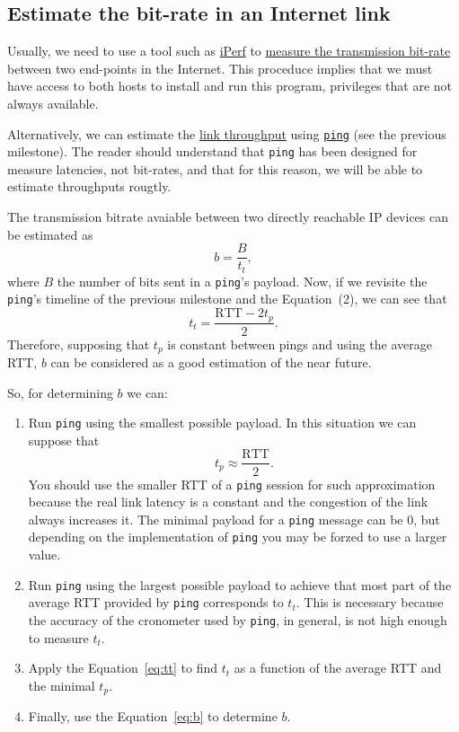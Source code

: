 \subsection{Estimate the bit-rate in an Internet link}

Usually, we need to use a tool such as \href{https://iperf.fr/}{iPerf}
to
\href{https://en.wikipedia.org/wiki/Measuring_network_throughput}{measure
  the transmission bit-rate} between two end-points in the
Internet. This proceduce implies that we must have access to both
hosts to install and run this program, privileges that are not always
available.

Alternatively, we can estimate the
\href{https://en.wikipedia.org/wiki/Throughput}{link throughput} using
\href{https://github.com/torvalds/linux/blob/master/net/ipv4/ping.c}{\texttt{ping}}
(see the previous milestone). The reader should understand that
\texttt{ping} has been designed for measure latencies, not bit-rates,
and that for this reason, we will be able to estimate throughputs
rougtly.

The transmission bitrate avaiable between two directly reachable IP
devices can be estimated as
\begin{equation}
  b=\frac{B}{t_t},
  \label{eq:b}
\end{equation}
where $B$ the number of bits sent in a \texttt{ping}'s payload. Now,
if we revisite the \texttt{ping}'s timeline of the previous milestone
and the Equation~(2), we can see that
\begin{equation}
  t_t = \frac{\text{RTT}-2t_p}{2}.
  \label{eq:tt}
\end{equation}
Therefore, supposing that $t_p$ is constant between pings and using
the average RTT, $b$ can be considered as a good estimation of the
near future.

So, for determining $b$ we can:
\begin{enumerate}
\item Run \texttt{ping} using the smallest possible payload. In this
  situation we can suppose that
  \begin{equation}
    t_p \approx \frac{\text{RTT}}{2}.
    \label{eq:tp}
  \end{equation}
  You should use the smaller RTT of a \texttt{ping} session for such
  approximation because the real link latency is a constant and the
  congestion of the link always increases it. The minimal payload for
  a \texttt{ping} message can be 0, but depending on the
  implementation of \texttt{ping} you may be forzed to use a larger
  value.
\item Run \texttt{ping} using the largest possible payload to achieve
  that most part of the average RTT provided by \texttt{ping}
  corresponds to $t_t$. This is necessary because the accuracy of the
  cronometer used by \texttt{ping}, in general, is not high enough to
  measure $t_t$.
\item Apply the Equation~\ref{eq:tt} to find $t_t$ as a function of
  the average RTT and the minimal $t_p$.
\item Finally, use the Equation~\ref{eq:b} to determine $b$.
\end{enumerate}


